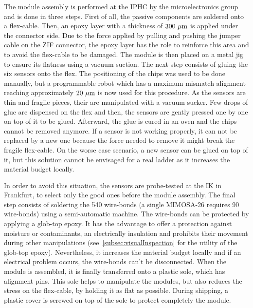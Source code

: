     The module assembly is performed at the IPHC by the microelectronics group and is done in three steps.
    First of all, the passive components are soldered onto a flex-cable.
    Then, an epoxy layer with a thickness of $300~\rm{\mu m}$ is applied under the connector side.
    Due to the force applied by pulling and pushing the jumper cable on the ZIF connector, the epoxy layer has the role to reinforce this area and to avoid the flex-cable to be damaged.
    The module is then placed on a metal jig to ensure its flatness using a vacuum suction.
    The next step consists of gluing the six sensors onto the flex.
    The positioning of the chips was used to be done manually, but a programmable robot which has a maximum mismatch alignment reaching approximately $20~\mu\rm{m}$ is now used for this procedure.
    As the sensors are thin and fragile pieces, their are manipulated with a vacuum sucker.
    Few drops of glue are dispensed on the flex and then, the sensors are gently pressed one by one on top of it to be glued.
    Afterward, the glue is cured in an oven and the chips cannot be removed anymore.
    If a sensor is not working properly, it can not be replaced by a new one because the force needed to remove it might break the fragile flex-cable.
    On the worse case scenario, a new sensor can be glued on top of it, but this solution cannot be envisaged for a real ladder as it increases the material budget locally.
    
    In order to avoid this situation, the sensors are probe-tested at the IK in Frankfurt, to select only the good ones before the module assembly.
    The final step consists of soldering the 540 wire-bonds (a single MIMOSA-26 requires 90 wire-bonds) using a semi-automatic machine.
    The wire-bonds can be protected by applying a glob-top epoxy.
    It has the advantage to offer a protection against moisture or contaminants, an electrically insulation and prohibits their movement during other manipulations (see~\ref{subsec:visualInspection} for the utility of the glob-top epoxy). 
    Nevertheless, it increases the material budget locally and if an electrical problem occurs, the wire-bonds can't be disconnected.
    When the module is assembled, it is finally transferred onto a plastic sole, which has alignment pins.
    This sole helps to manipulate the modules, but also reduces the stress on the flex-cable, by holding it as flat as possible.
    During shipping, a plastic cover is screwed on top of the sole to protect completely the module.

